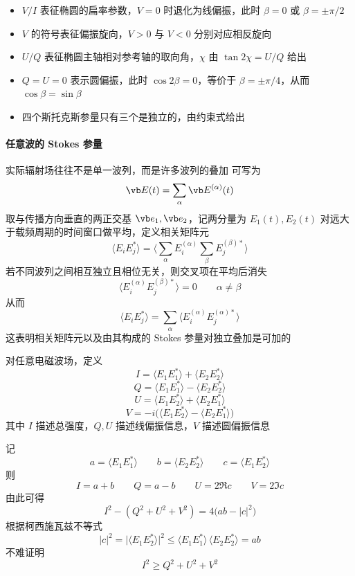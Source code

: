 \begin{itemize}
  \item $V/I$ 表征椭圆的扁率参数，$V=0$ 时退化为线偏振，此时 $\beta=0$ 或 $\beta=\pm\pi/2$
  \item $V$ 的符号表征偏振旋向，$V>0$ 与 $V<0$ 分别对应相反旋向
  \item $U/Q$ 表征椭圆主轴相对参考轴的取向角，$\chi$ 由 $\tan2\chi=U/Q$ 给出
  \item $Q=U=0$ 表示圆偏振，此时 $\cos2\beta=0$，等价于 $\beta=\pm\pi/4$，从而 $\cos\beta=\sin\beta$
  \item 四个斯托克斯参量只有三个是独立的，由约束式给出
\end{itemize}
\paragraph{任意波的 Stokes 参量}


实际辐射场往往不是单一波列，而是许多波列的叠加  
可写为
\[
\vb E(t)=\sum_\alpha \vb E^{(\alpha)}(t)
\]
取与传播方向垂直的两正交基 $\vb e_1,\vb e_2$，记两分量为 $E_1(t),E_2(t)$  
对远大于载频周期的时间窗口做平均，定义相关矩阵元
\[
\langle E_i E_j^*\rangle
=
\Big\langle \sum_\alpha E_i^{(\alpha)} \sum_\beta E_j^{(\beta)*}\Big\rangle
\]
若不同波列之间相互独立且相位无关，则交叉项在平均后消失
\[
\big\langle E_i^{(\alpha)}E_j^{(\beta)*}\big\rangle=0
\qquad
\alpha\neq\beta
\]
从而
\[
\langle E_i E_j^*\rangle=\sum_\alpha \big\langle E_i^{(\alpha)}E_j^{(\alpha)*}\big\rangle
\]
这表明相关矩阵元以及由其构成的 Stokes 参量对独立叠加是可加的

\begin{definition}
对任意电磁波场，定义
\[
I=\langle E_1E_1^*\rangle+\langle E_2E_2^*\rangle
\]
\[
Q=\langle E_1E_1^*\rangle-\langle E_2E_2^*\rangle
\]
\[
U=\langle E_1E_2^*\rangle+\langle E_2E_1^*\rangle
\]
\[
V=-i\bigl(\langle E_1E_2^*\rangle-\langle E_2E_1^*\rangle\bigr)
\]
其中 $I$ 描述总强度，$Q,U$ 描述线偏振信息，$V$ 描述圆偏振信息
\end{definition}

记
\[
a=\langle E_1E_1^*\rangle
\qquad
b=\langle E_2E_2^*\rangle
\qquad
c=\langle E_1E_2^*\rangle
\]
则
\[
I=a+b
\qquad
Q=a-b
\qquad
U=2\Re c
\qquad
V=2\Im c
\]
由此可得
\[
I^2-(Q^2+U^2+V^2)=4\bigl(ab-|c|^2\bigr)
\]
根据柯西施瓦兹不等式
\[
|c|^2=\bigl|\langle E_1E_2^*\rangle\bigr|^2
\le \langle E_1E_1^*\rangle\,\langle E_2E_2^*\rangle
=ab
\]
不难证明
\begin{equation}
I^2\ge Q^2+U^2+V^2
\end{equation}

